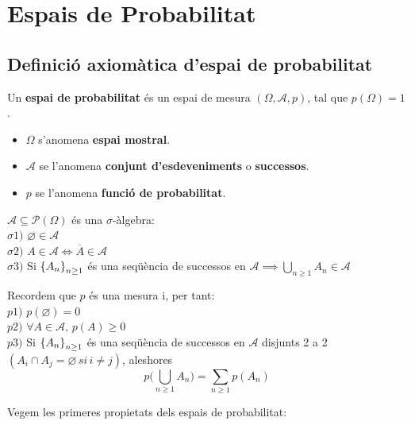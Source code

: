 \section{Espais de Probabilitat}

\subsection{Definició axiomàtica d'espai de probabilitat}

\begin{defi}
  Un \textbf{espai de probabilitat} és un espai de mesura $(\Omega, \mathcal{A}, p)$, tal que $p(\Omega) = 1$.
  \begin{itemize}
      \item $\Omega$ s'anomena \textbf{espai mostral}.
      \item $\mathcal{A}$ se l'anomena \textbf{conjunt d'esdeveniments} o \textbf{successos}.
      \item $p$ se l'anomena \textbf{funció de probabilitat}.
  \end{itemize}
\end{defi}

\begin{obs}
  $\mathcal{A} \subseteq \mathcal{P}(\Omega)$ és una $\sigma$-àlgebra: \\
  $\sigma1)$ $\varnothing \in \mathcal{A}$ \\
  $\sigma2)$ $A \in \mathcal{A} \iff \overline{A} \in \mathcal{A}$ \\
  $\sigma3)$ Si $\left\{A_{n}\right\}_{n\geq1}$ és una seqüència de successos en $\mathcal{A} \implies \bigcup\limits_{n\geq1}A_{n} \in \mathcal{A}$
\end{obs}

\begin{obs}
  Recordem que $p$ és una mesura i, per tant: \\
  $p1)$ $p(\varnothing) = 0$ \\
  $p2)$ $\forall A \in \mathcal{A},\, p(A)\geq0$ \\
  $p3)$ Si $\left\{A_{n}\right\}_{n\geq1}$ és una seqüència de successos en $\mathcal{A}$ disjunts 2 a 2 $(A_{i}\cap A_{j} = \varnothing \, si \, i \not =j)$, aleshores 
  \[
    p\bigg(\bigcup\limits_{n\geq1}A_{n}\bigg) = \sum_{n\geq1}p(A_{n})
  \]
\end{obs}

Vegem les primeres propietats dels espais de probabilitat:

